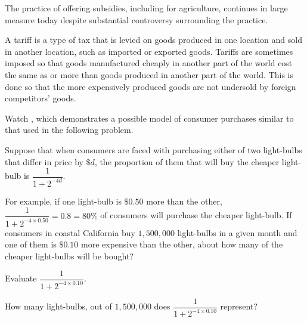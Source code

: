 \documentclass{ximera}
\begin{document}
The practice of offering subsidies, including for agriculture, continues in large measure today despite substantial controversy surrounding the practice.

A tariff is a type of tax that is levied on goods produced in one location and sold in another location, such as imported or exported goods. Tariffs are sometimes imposed so that goods manufactured cheaply in another part of the world cost the same as or more than goods produced in another part of the world. This is done so that the more expensively produced goods are not undersold by foreign competitors' goods.

\begin{question}
Watch , which demonstrates a possible model of consumer purchases similar to that used in the following problem.

Suppose that when consumers are faced with purchasing either of two light-bulbs that differ in price by $\$d$, the proportion of them that will buy the cheaper light-bulb is $\dfrac{1}{1+2^{-4d}}$.
\begin{center}
\end{center}
For example, if one light-bulb is $\$0.50$ more than the other, $\dfrac{1}{1+2^{-4\times 0.50}}=0.8=80\%$ of consumers will purchase the cheaper light-bulb.
If consumers in coastal California buy $1,500,000$ light-bulbs in a given month and one of them is $\$0.10$ more expensive than the other, about how many of the cheaper light-bulbs will be bought?


 \begin{multipleChoice}
    \end{multipleChoice}
\begin{hint}
Evaluate $\dfrac{1}{1+2^{-4\times 0.10}}$.
\end{hint}
\begin{hint}
How many light-bulbs, out of $1,500,000$ does $\dfrac{1}{1+2^{-4\times 0.10}}$ represent?
\end{hint}

\end{question}
\end{document}
